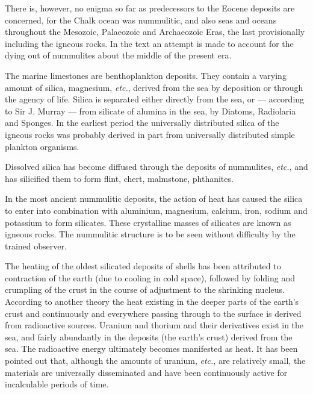 \documentclass[a4paper, 12pt, oneside, landscape]{article}
\begin{document}
There is, however, no enigma so far as predecessors to the Eocene deposits are concerned, for the Chalk ocean was nummulitic, and also seas and oceans throughout the Mesozoic, Palaeozoic and Archaeozoic Eras, the last provisionally including the igneous rocks. In the text an attempt is made to account for the dying out of nummulites about the middle of the present era.

The marine limestones are benthoplankton deposits. They contain a varying amount of silica, magnesium, \emph{etc.}, derived from the sea by deposition or through the agency of life. Silica is separated either directly from the sea, or --- according to Sir J. Murray --- from silicate of alumina in the sea, by Diatoms, Radiolaria and Sponges. In the earliest period the universally distributed silica of the igneous rocks was probably derived in part from universally distributed simple plankton organisms.

Dissolved silica has become diffused through the deposits of nummulites, \emph{etc.}, and has silicified them to form flint, chert, malmstone, phthanites.

In the most ancient nummulitic deposits, the action of heat has caused the silica to enter into combination with aluminium, magnesium, calcium, iron, sodium and potassium to form silicates. These crystalline masses of silicates are known as igneous rocks. The nummulitic structure is to be seen without difficulty by the trained observer.

The heating of the oldest silicated deposits of shells has been attributed to contraction of the earth (due to cooling in cold space), followed by folding and crumpling of the crust in the course of adjustment to the shrinking nucleus. According to another theory the heat existing in the deeper parts of the earth's crust and continuously and everywhere passing through to the surface is derived from radioactive sources. Uranium and thorium and their derivatives exist in the sea, and fairly abundantly in the deposits (the earth's crust) derived from the sea. The radioactive energy ultimately becomes manifested as heat. It has been pointed out that, although the amounts of uranium, \emph{etc.}, are relatively small, the materials are universally disseminated and have been continuously active for incalculable periods of time.
\end{document}
